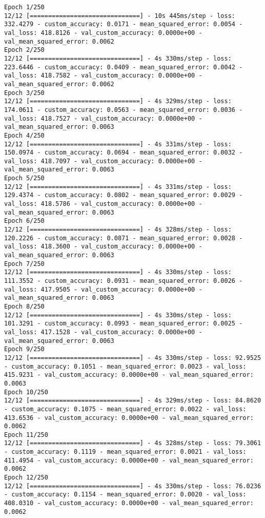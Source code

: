 \begin{lstlisting}
Epoch 1/250
12/12 [==============================] - 10s 445ms/step - loss: 332.4279 - custom_accuracy: 0.0171 - mean_squared_error: 0.0054 - val_loss: 418.8126 - val_custom_accuracy: 0.0000e+00 - val_mean_squared_error: 0.0062
Epoch 2/250
12/12 [==============================] - 4s 330ms/step - loss: 223.6446 - custom_accuracy: 0.0409 - mean_squared_error: 0.0042 - val_loss: 418.7582 - val_custom_accuracy: 0.0000e+00 - val_mean_squared_error: 0.0062
Epoch 3/250
12/12 [==============================] - 4s 329ms/step - loss: 174.0611 - custom_accuracy: 0.0563 - mean_squared_error: 0.0036 - val_loss: 418.7527 - val_custom_accuracy: 0.0000e+00 - val_mean_squared_error: 0.0063
Epoch 4/250
12/12 [==============================] - 4s 331ms/step - loss: 150.0974 - custom_accuracy: 0.0694 - mean_squared_error: 0.0032 - val_loss: 418.7097 - val_custom_accuracy: 0.0000e+00 - val_mean_squared_error: 0.0063
Epoch 5/250
12/12 [==============================] - 4s 331ms/step - loss: 129.4374 - custom_accuracy: 0.0802 - mean_squared_error: 0.0029 - val_loss: 418.5786 - val_custom_accuracy: 0.0000e+00 - val_mean_squared_error: 0.0063
Epoch 6/250
12/12 [==============================] - 4s 328ms/step - loss: 120.2226 - custom_accuracy: 0.0871 - mean_squared_error: 0.0028 - val_loss: 418.3600 - val_custom_accuracy: 0.0000e+00 - val_mean_squared_error: 0.0063
Epoch 7/250
12/12 [==============================] - 4s 330ms/step - loss: 111.3552 - custom_accuracy: 0.0931 - mean_squared_error: 0.0026 - val_loss: 417.9505 - val_custom_accuracy: 0.0000e+00 - val_mean_squared_error: 0.0063
Epoch 8/250
12/12 [==============================] - 4s 330ms/step - loss: 101.3291 - custom_accuracy: 0.0993 - mean_squared_error: 0.0025 - val_loss: 417.1528 - val_custom_accuracy: 0.0000e+00 - val_mean_squared_error: 0.0063
Epoch 9/250
12/12 [==============================] - 4s 330ms/step - loss: 92.9525 - custom_accuracy: 0.1051 - mean_squared_error: 0.0023 - val_loss: 415.9231 - val_custom_accuracy: 0.0000e+00 - val_mean_squared_error: 0.0063
Epoch 10/250
12/12 [==============================] - 4s 329ms/step - loss: 84.8620 - custom_accuracy: 0.1075 - mean_squared_error: 0.0022 - val_loss: 413.6536 - val_custom_accuracy: 0.0000e+00 - val_mean_squared_error: 0.0062
Epoch 11/250
12/12 [==============================] - 4s 328ms/step - loss: 79.3061 - custom_accuracy: 0.1119 - mean_squared_error: 0.0021 - val_loss: 411.4954 - val_custom_accuracy: 0.0000e+00 - val_mean_squared_error: 0.0062
Epoch 12/250
12/12 [==============================] - 4s 330ms/step - loss: 76.0236 - custom_accuracy: 0.1154 - mean_squared_error: 0.0020 - val_loss: 408.0310 - val_custom_accuracy: 0.0000e+00 - val_mean_squared_error: 0.0062

\end{lstlisting}
